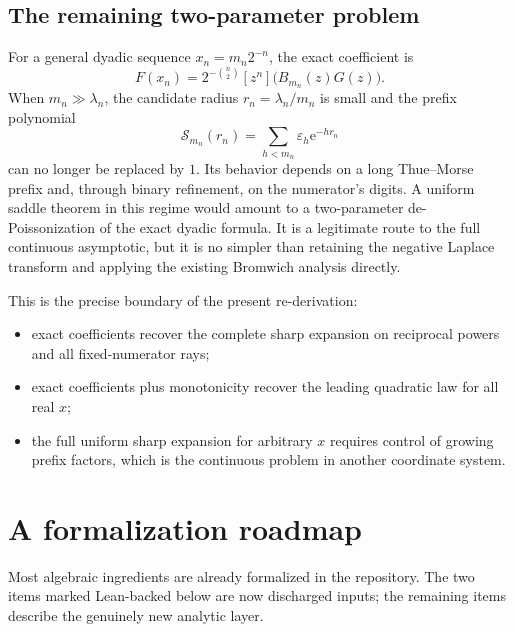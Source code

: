 \documentclass[11pt,oneside]{article}
\theoremstyle{definition}
\theoremstyle{remark}
\newcommand{\e}{\mathrm e}
\newcommand{\Prefix}{\mathcal S}
\newcommand{\TM}{\varepsilon}
\begin{document}
\subsection{The remaining two-parameter problem}

For a general dyadic sequence $x_n=m_n2^{-n}$, the exact coefficient is
\begin{equation}
 F(x_n)=2^{-\binom n2}[z^n]\bigl(B_{m_n}(z)G(z)\bigr).
\end{equation}
When $m_n\gg\lambda_n$, the candidate radius $r_n=\lambda_n/m_n$ is small and the prefix polynomial
\begin{equation}
 \Prefix_{m_n}(r_n)=\sum_{h<m_n}\TM_h\e^{-hr_n}
\label{eq:large-prefix-problem}
\end{equation}
can no longer be replaced by $1$.  Its behavior depends on a long Thue--Morse prefix and, through binary refinement, on the numerator's digits.  A uniform saddle theorem in this regime would amount to a two-parameter de-Poissonization of the exact dyadic formula.  It is a legitimate route to the full continuous asymptotic, but it is no simpler than retaining the negative Laplace transform and applying the existing Bromwich analysis directly.

This is the precise boundary of the present re-derivation:
\begin{itemize}
\item exact coefficients recover the complete sharp expansion on reciprocal powers and all fixed-numerator rays;
\item exact coefficients plus monotonicity recover the leading quadratic law for all real $x$;
\item the full uniform sharp expansion for arbitrary $x$ requires control of growing prefix factors, which is the continuous problem in another coordinate system.
\end{itemize}

\section{A formalization roadmap}
\label{sec:formalization}

Most algebraic ingredients are already formalized in the repository.  The two items marked
Lean-backed below are now discharged inputs; the remaining items describe the genuinely new
analytic layer.
\end{document}
